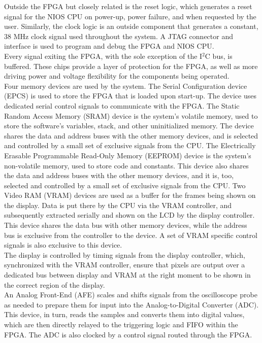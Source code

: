 \documentclass[titlepage]{scrartcl}
\begin{document}
	Outside the FPGA but closely related is the reset logic, which generates a reset signal for the NIOS CPU on power-up, power failure, and when requested by the user. Similarly, the clock logic is an outside component that generates a constant, 38 MHz clock signal used throughout the system. A JTAG connector and interface is used to program and debug the FPGA and NIOS CPU.\\

	Every signal exiting the FPGA, with the sole exception of the I$^2$C bus, is buffered. These chips provide a layer of protection for the FPGA, as well as more driving power and voltage flexibility for the components being operated.\\

	Four memory devices are used by the system. The Serial Configuration device (EPCS) is used to store the FPGA that is loaded upon start-up. The device uses dedicated serial control signals to communicate with the FPGA. The Static Random Access Memory (SRAM) device is the system's volatile memory, used to store the software's variables, stack, and other uninitialized memory. The device shares the data and address buses with the other memory devices, and is selected and controlled by a small set of exclusive signals from the CPU. The Electrically Erasable Programmable Read-Only Memory (EEPROM) device is the system's non-volatile memory, used to store code and constants. This device also shares the data and address buses with the other memory devices, and it is, too, selected and controlled by a small set of exclusive signals from the CPU. Two Video RAM (VRAM) devices are used as a buffer for the frames being shown on the display. Data is put there by the CPU via the VRAM controller, and subsequently extracted serially and shown on the LCD by the display controller. This device shares the data bus with other memory devices, while the address bus is exclusive from the controller to the device. A set of VRAM specific control signals is also exclusive to this device.\\

	The display is controlled by timing signals from the display controller, which, synchronized with the VRAM controller, ensure that pixels are output over a dedicated bus between display and VRAM at the right moment to be shown in the correct region of the display.\\

	An Analog Front-End (AFE) scales and shifts signals from the oscilloscope probe as needed to prepare them for input into the Analog-to-Digital Converter (ADC). This device, in turn, reads the samples and converts them into digital values, which are then directly relayed to the triggering logic and FIFO within the FPGA. The ADC is also clocked by a control signal routed through the FPGA.\\
\end{document}
